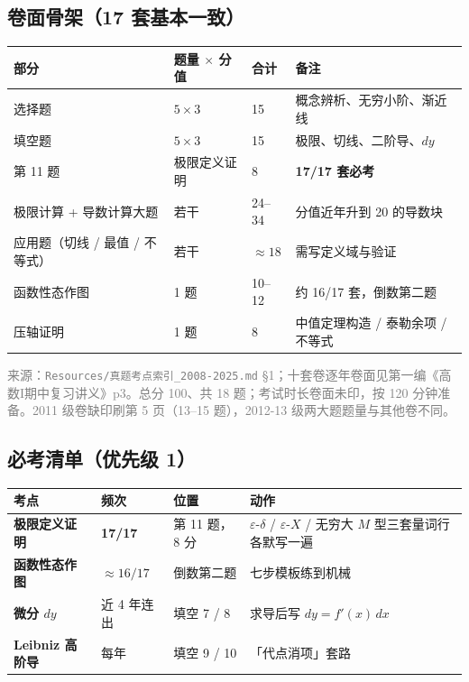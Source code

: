 \documentclass[11pt,a4paper]{ctexart}
\newcommand{\eps}{\varepsilon}
\begin{document}
\subsection{卷面骨架（17 套基本一致）}
\begin{longtable}{@{}p{5.2cm}p{3.0cm}p{2.2cm}p{4.6cm}@{}}
\toprule
\textbf{部分} & \textbf{题量 $\times$ 分值} & \textbf{合计} & \textbf{备注} \\
\midrule
选择题 & $5\times3$ & 15 & 概念辨析、无穷小阶、渐近线 \\
填空题 & $5\times3$ & 15 & 极限、切线、二阶导、$dy$ \\
第 11 题 & 极限定义证明 & 8 & \textbf{17/17 套必考} \\
极限计算 + 导数计算大题 & 若干 & 24--34 & 分值近年升到 20 的导数块 \\
应用题（切线 / 最值 / 不等式） & 若干 & $\approx18$ & 需写定义域与验证 \\
函数性态作图 & 1 题 & 10--12 & 约 16/17 套，倒数第二题 \\
压轴证明 & 1 题 & 8 & 中值定理构造 / 泰勒余项 / 不等式 \\
\bottomrule
\end{longtable}
\noindent\textcolor{gray}{\footnotesize 来源：\texttt{Resources/真题考点索引\_2008-2025.md} \S1；十套卷逐年卷面见第一编《高数I期中复习讲义》p3。总分 100、共 18 题；考试时长卷面未印，按 120 分钟准备。2011 级卷缺印刷第 5 页（13--15 题），2012-13 级两大题题量与其他卷不同。}

\subsection{必考清单（优先级 1）}
\begin{longtable}{@{}p{3.4cm}p{1.8cm}p{3.0cm}p{6.8cm}@{}}
\toprule
\textbf{考点} & \textbf{频次} & \textbf{位置} & \textbf{动作} \\
\midrule
\textbf{极限定义证明} & \textbf{17/17} & 第 11 题，8 分 & $\eps$-$\delta$ / $\eps$-$X$ / 无穷大 $M$ 型三套量词行各默写一遍 \\
\textbf{函数性态作图} & $\approx16/17$ & 倒数第二题 & 七步模板练到机械 \\
\textbf{微分 $dy$} & 近 4 年连出 & 填空 7 / 8 & 求导后写 $dy=f'(x)\,dx$ \\
\textbf{Leibniz 高阶导} & 每年 & 填空 9 / 10 & 「代点消项」套路 \\
\bottomrule
\end{longtable}
\end{document}
